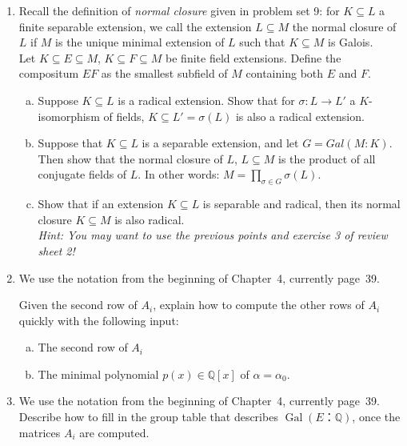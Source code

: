\documentclass[12pt,a4paper]{article}
\newcommand{\wt}[1]{\widetilde{#1}}
\DeclareMathOperator{\gal}{Gal}
\begin{document}
 
\begin{enumerate}
\item 
Recall the definition of \textit{normal closure} given in problem set 9: for $K\subseteq L$ a finite separable extension, we call the extension $L\subseteq M$ the normal closure of $L$ if $M$ is the unique minimal extension of $L$ such that $K\subseteq M$ is Galois.  \\

Let $K \subseteq E \subseteq M$, $K \subseteq F \subseteq M$ be finite field extensions. Define the compositum $EF$ as the smallest subfield of $M$ containing both $E$ and $F$. 

\begin{enumerate}[(a)]

\item Suppose $K\subseteq L$ is a radical extension. Show that for $\sigma: L\xrightarrow{}L'$ a $K$-isomorphism of fields, $K\subseteq L'=\sigma(L)$ is also a radical extension. 
\item Suppose that $K\subseteq L$ is a separable extension, and let $G=Gal(M:K)$. Then show that the normal closure of $L$, $L\subseteq M$ is the product of all conjugate fields of $L$. In other words: $M=\prod_{\sigma\in G}\sigma(L)$.
\item Show that if an extension $K\subseteq L$ is separable and radical, then its normal closure $K\subseteq M$ is also radical. \\ \textit{Hint: You may want to use the previous points and exercise 3 of review sheet 2!}
\end{enumerate}
\item We use the notation from the beginning of Chapter~4, currently page~39.

  Given the second row of $A_i$,
  explain how to compute the other rows of $A_i$ quickly with the following input:
  \begin{enumerate}[a)] 
  \item The second row of $A_i$
  \item The minimal polynomial $p(x) ∈ℚ[x]$ of $α = α_0$. 
  \end{enumerate}
 \item We use the notation from the beginning of Chapter~4, currently page~39. Describe how to fill in the group table that describes $\gal(E：ℚ)$, once the matrices $A_i$ are computed. 


\end{enumerate}
\end{document}
